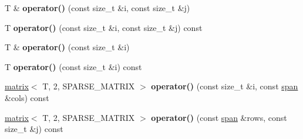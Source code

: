 \begin{DoxyCompactItemize}
\item 
\hypertarget{classkeycpp_1_1matrix_3_01_t_00_012_00_01_s_p_a_r_s_e___m_a_t_r_i_x_01_4_a2e821c1a27bc9200764247ed384a734e}{T \& {\bfseries operator()} (const size\-\_\-t \&i, const size\-\_\-t \&j)}\label{classkeycpp_1_1matrix_3_01_t_00_012_00_01_s_p_a_r_s_e___m_a_t_r_i_x_01_4_a2e821c1a27bc9200764247ed384a734e}

\item 
\hypertarget{classkeycpp_1_1matrix_3_01_t_00_012_00_01_s_p_a_r_s_e___m_a_t_r_i_x_01_4_a74e98658bb65a04ab7372567b37eea52}{T {\bfseries operator()} (const size\-\_\-t \&i, const size\-\_\-t \&j) const }\label{classkeycpp_1_1matrix_3_01_t_00_012_00_01_s_p_a_r_s_e___m_a_t_r_i_x_01_4_a74e98658bb65a04ab7372567b37eea52}

\item 
\hypertarget{classkeycpp_1_1matrix_3_01_t_00_012_00_01_s_p_a_r_s_e___m_a_t_r_i_x_01_4_aaca81a859311fdefdb70bbb8a6f38e93}{T \& {\bfseries operator()} (const size\-\_\-t \&i)}\label{classkeycpp_1_1matrix_3_01_t_00_012_00_01_s_p_a_r_s_e___m_a_t_r_i_x_01_4_aaca81a859311fdefdb70bbb8a6f38e93}

\item 
\hypertarget{classkeycpp_1_1matrix_3_01_t_00_012_00_01_s_p_a_r_s_e___m_a_t_r_i_x_01_4_a7a12a5086bbcac8a4ed8d210cb9d117c}{T {\bfseries operator()} (const size\-\_\-t \&i) const }\label{classkeycpp_1_1matrix_3_01_t_00_012_00_01_s_p_a_r_s_e___m_a_t_r_i_x_01_4_a7a12a5086bbcac8a4ed8d210cb9d117c}

\item 
\hypertarget{classkeycpp_1_1matrix_3_01_t_00_012_00_01_s_p_a_r_s_e___m_a_t_r_i_x_01_4_a6499ce020565e0f666ef966502b134ce}{\hyperlink{classkeycpp_1_1matrix}{matrix}$<$ T, 2, S\-P\-A\-R\-S\-E\-\_\-\-M\-A\-T\-R\-I\-X $>$ {\bfseries operator()} (const size\-\_\-t \&i, const \hyperlink{classkeycpp_1_1span}{span} \&cols) const }\label{classkeycpp_1_1matrix_3_01_t_00_012_00_01_s_p_a_r_s_e___m_a_t_r_i_x_01_4_a6499ce020565e0f666ef966502b134ce}

\item 
\hypertarget{classkeycpp_1_1matrix_3_01_t_00_012_00_01_s_p_a_r_s_e___m_a_t_r_i_x_01_4_a544a0f54e554ca651303896e6c25146b}{\hyperlink{classkeycpp_1_1matrix}{matrix}$<$ T, 2, S\-P\-A\-R\-S\-E\-\_\-\-M\-A\-T\-R\-I\-X $>$ {\bfseries operator()} (const \hyperlink{classkeycpp_1_1span}{span} \&rows, const size\-\_\-t \&j) const }\label{classkeycpp_1_1matrix_3_01_t_00_012_00_01_s_p_a_r_s_e___m_a_t_r_i_x_01_4_a544a0f54e554ca651303896e6c25146b}


\end{DoxyCompactItemize}
